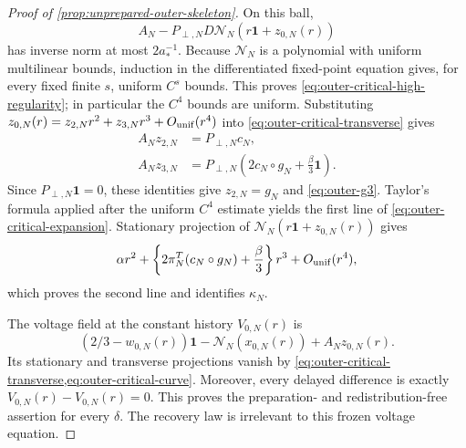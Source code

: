 \begin{proof}[Proof of \cref{prop:unprepared-outer-skeleton}]
On this ball,
\begin{equation}
 A_N-P_{\perp,N}D\mathcal N_N(r\mathbf1+z_{0,N}(r))
                                                               \label{eq:outer-critical-derivative}
\end{equation}
has inverse norm at most \(2a_*^{-1}\).  Because \(\mathcal N_N\) is a
polynomial with uniform multilinear bounds, induction in the differentiated
fixed-point equation gives, for every fixed finite \(s\), uniform \(C^s\)
bounds.  This proves \cref{eq:outer-critical-high-regularity}; in particular
the \(C^4\) bounds are uniform.  Substituting
\(z_{0,N}(r)=z_{2,N}r^2+z_{3,N}r^3+O_{\rm unif}(r^4)\) into
\cref{eq:outer-critical-transverse} gives
\begin{align*}
 A_Nz_{2,N}&=P_{\perp,N}c_N,\\
 A_Nz_{3,N}&=P_{\perp,N}
       \left(2c_N\circ g_N+\frac\beta3\mathbf1\right).
\end{align*}
Since \(P_{\perp,N}\mathbf1=0\), these identities give
\(z_{2,N}=g_N\) and \cref{eq:outer-g3}.  Taylor's formula applied after
the uniform \(C^4\) estimate yields the first line of
\cref{eq:outer-critical-expansion}.  Stationary projection of
\(\mathcal N_N(r\mathbf1+z_{0,N}(r))\) gives
\begin{equation*}
 \alpha r^2+\left\{2\pi_N^T(c_N\circ g_N)+\frac\beta3\right\}r^3
 +O_{\rm unif}(r^4),
\end{equation*}
which proves the second line and identifies \(\kappa_N\).

The voltage field at the constant history \(V_{0,N}(r)\) is
\begin{equation*}
 (2/3-w_{0,N}(r))\mathbf1
 -\mathcal N_N(x_{0,N}(r))+A_Nz_{0,N}(r).
\end{equation*}
Its stationary and transverse projections vanish by
\cref{eq:outer-critical-transverse,eq:outer-critical-curve}.  Moreover,
every delayed difference is exactly
\(V_{0,N}(r)-V_{0,N}(r)=0\).  This proves the preparation- and
redistribution-free assertion for every \(\delta\).  The recovery law is
irrelevant to this frozen voltage equation.


\end{proof}
